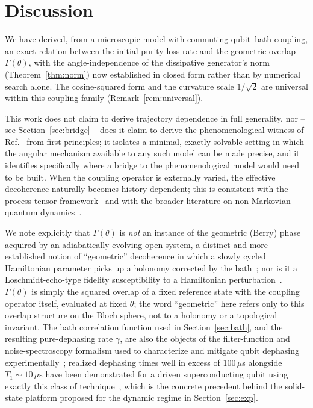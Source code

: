\documentclass[aps,pra,reprint,superscriptaddress,nofootinbib,longbibliography]{revtex4-2}
\begin{document}
\section{Discussion}
\label{sec:discussion}

We have derived, from a microscopic model with commuting qubit--bath
coupling, an exact relation between the initial purity-loss rate and
the geometric overlap $\Gamma(\theta)$, with the angle-independence of
the dissipative generator's norm (Theorem~\ref{thm:norm}) now
established in closed form rather than by numerical search alone. The
cosine-squared form and the curvature scale $1/\sqrt2$ are universal
within this coupling family (Remark~\ref{rem:universal}).

This work does not claim to derive trajectory dependence in full
generality, nor -- see Section~\ref{sec:bridge} -- does it claim to
derive the phenomenological witness of Ref.~\cite{rodrigues2025} from
first principles; it isolates a minimal, exactly solvable setting in
which the angular mechanism available to any such model can be made
precise, and it identifies specifically where a bridge to the
phenomenological model would need to be built. When the coupling
operator is externally varied, the effective decoherence naturally
becomes history-dependent; this is consistent with the process-tensor
framework~\cite{pollock2018nonmarkovian,milz2021quantum} and with the
broader literature on non-Markovian quantum
dynamics~\cite{rivas2014quantum,devega2017dynamics,breuer2009measure}.

We note explicitly that $\Gamma(\theta)$ is \emph{not} an instance of
the geometric (Berry) phase acquired by an adiabatically evolving open
system, a distinct and more established notion of ``geometric''
decoherence in which a slowly cycled Hamiltonian parameter picks up a
holonomy corrected by the
bath~\cite{dechiara2003berry}; nor is it a Loschmidt-echo-type fidelity
susceptibility to a Hamiltonian
perturbation~\cite{cucchietti2003decoherence}. $\Gamma(\theta)$ is
simply the squared overlap of a fixed reference state with the
coupling operator itself, evaluated at fixed $\theta$; the word
``geometric'' here refers only to this overlap structure on the Bloch
sphere, not to a holonomy or a topological invariant. The bath
correlation function used in Section~\ref{sec:bath}, and the resulting
pure-dephasing rate $\gamma$, are also the objects of the filter-function
and noise-spectroscopy formalism used to characterize and mitigate
qubit dephasing experimentally~\cite{cywinski2008enhance}; realized
dephasing times well in excess of $100\,\mu$s alongside $T_1\sim
10\,\mu$s have been demonstrated for a driven superconducting qubit
using exactly this class of
technique~\cite{bylander2011noise}, which is the concrete precedent
behind the solid-state platform proposed for the dynamic regime in
Section~\ref{sec:exp}.
\end{document}
